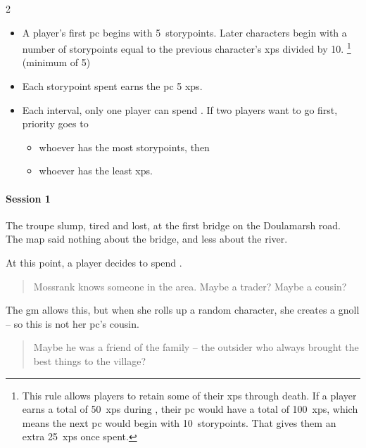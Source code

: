 \begin{multicols}{2}

\begin{itemize}
  \item
  A player's first \gls{pc} begins with 5~\glspl{storypoint}.
  \label{storyPointInheritance}
  Later characters begin with a number of \glspl{storypoint} equal to the previous character's \glspl{xp} divided by 10.%
  \footnote{This rule allows players to retain some of their \glspl{xp} through death.
  If a player earns a total of 50~\glspl{xp} during , their \gls{pc} would have a total of 100~\glspl{xp}, which means the next \gls{pc} would begin with 10~\glspl{storypoint}.
  That gives them an extra 25~\glspl{xp} once spent.} (minimum of 5)
  \item
  Each \gls{storypoint} spent earns the \gls{pc} 5 \glspl{xp}.
  \item
  Each \gls{interval}, only one player can spend .
  If two players want to go first, priority goes to
  \begin{itemize}
    \item
    whoever has the most \glspl{storypoint}, then
    \item
    whoever has the least \glspl{xp}.
  \end{itemize}
\end{itemize}

\begin{exampletext}
  \paragraph{Session 1}
  The troupe slump, tired and lost, at the first bridge on the Doulamarsh road.
  The map said nothing about the bridge, and less about the river.

  At this point, a player decides to spend .

  \begin{quotation}
    Mossrank knows someone in the area.
    Maybe a trader?
    Maybe a cousin?
  \end{quotation}

  The \gls{gm} allows this, but when she rolls up a random character, she creates a gnoll -- so this is not her \gls{pc}'s cousin.

  \begin{quotation}
    Maybe he was a friend of the family -- the outsider who always brought the best things to the \gls{village}?
  \end{quotation}


\end{exampletext}
\end{multicols}
